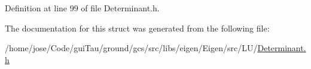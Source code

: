 Definition at line 99 of file Determinant.\-h.



The documentation for this struct was generated from the following file\-:\begin{DoxyCompactItemize}
\item 
/home/jose/\-Code/gui\-Tau/ground/gcs/src/libs/eigen/\-Eigen/src/\-L\-U/\hyperlink{_determinant_8h}{Determinant.\-h}\end{DoxyCompactItemize}
